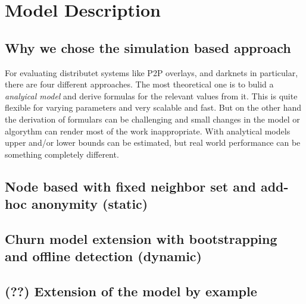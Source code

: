 \chapter{Model Description}

\section{Why we chose the simulation based approach}

For evaluating distributet systems like P2P overlays, and darknets in particular, there are four different approaches. The most theoretical one is to bulid a \emph{analyical model} and derive formulas for the relevant values from it. This is quite flexible for varying parameters and very scalable and fast. But on the other hand the derivation of formulars can be challenging and small changes in the model or algorythm can render most of the work inappropriate. With analytical models upper and/or lower bounds can be estimated, but real world performance can be something completely different.



\section{Node based with fixed neighbor set and add-hoc anonymity (static)}



\section{Churn model extension with bootstrapping and offline detection (dynamic)}
\section{(??) Extension of the model by example}
